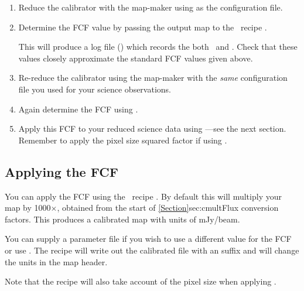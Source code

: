 \begin{enumerate}
\item Reduce the calibrator with the map-maker using
   as the configuration file.

\item Determine the FCF value by passing the output map to the
  \picard\ recipe
  .
\begin{terminalv}
\end{terminalv}
This will produce a log file () which records the
both \fcfb\ and \fcfa. Check that these values closely approximate the
standard FCF values given above.

\item Re-reduce the calibrator using the map-maker with the
  \emph{same} configuration file you used for your science
  observations.

\item Again determine the FCF using .

\item Apply this FCF to your reduced science data using \cmult---see
  the next section. Remember to apply the pixel size squared factor if
  using \fcfa.
\end{enumerate}

\subsection{Applying the FCF}

You can apply the FCF using the \picard\ recipe
.
By default this will multiply your map by 1000$\times$\fcfb, obtained
from the start of \cref{Section}{sec:cmult}{Flux conversion
  factors}. This produces a calibrated map with units of mJy/beam.

You can supply a parameter file if you wish to use a different value
for the FCF or use \fcfa. The recipe will write out the calibrated
file with an  suffix and will change the units in the map
header.

\begin{terminalv}
\end{terminalv}
Note that the recipe will also take account of the pixel size when
applying \fcfa.


